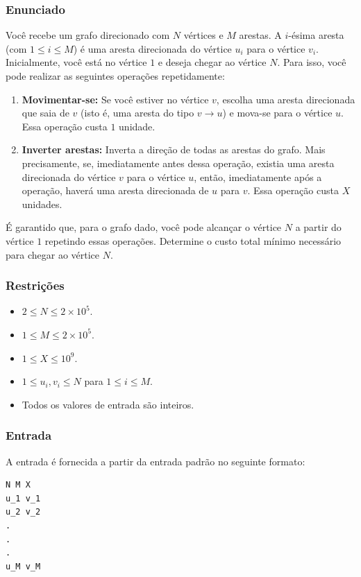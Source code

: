\subsubsection*{Enunciado}
Você recebe um grafo direcionado com \(N\) vértices e \(M\) arestas. A \(i\)-ésima aresta (com \(1 \le i \le M\)) é uma aresta direcionada do vértice \(u_i\) para o vértice \(v_i\). Inicialmente, você está no vértice \(1\) e deseja chegar ao vértice \(N\). Para isso, você pode realizar as seguintes operações repetidamente:
\begin{enumerate}
    \item \textbf{Movimentar-se:} Se você estiver no vértice \(v\), escolha uma aresta direcionada que saia de \(v\) (isto é, uma aresta do tipo \(v \to u\)) e mova-se para o vértice \(u\). Essa operação custa \(1\) unidade.
    \item \textbf{Inverter arestas:} Inverta a direção de todas as arestas do grafo. Mais precisamente, se, imediatamente antes dessa operação, existia uma aresta direcionada do vértice \(v\) para o vértice \(u\), então, imediatamente após a operação, haverá uma aresta direcionada de \(u\) para \(v\). Essa operação custa \(X\) unidades.
\end{enumerate}

É garantido que, para o grafo dado, você pode alcançar o vértice \(N\) a partir do vértice \(1\) repetindo essas operações. Determine o custo total mínimo necessário para chegar ao vértice \(N\).

\subsubsection*{Restrições}
\begin{itemize}
    \item \(2 \leq N \leq 2 \times 10^5\).
    \item \(1 \leq M \leq 2 \times 10^5\).
    \item \(1 \leq X \leq 10^9\).
    \item \(1 \leq u_i, v_i \leq N\) para \(1 \le i \le M\).
    \item Todos os valores de entrada são inteiros.
\end{itemize}

\subsubsection*{Entrada}
A entrada é fornecida a partir da entrada padrão no seguinte formato:
\begin{verbatim}
N M X
u_1 v_1
u_2 v_2
.
.
.
u_M v_M
\end{verbatim}

